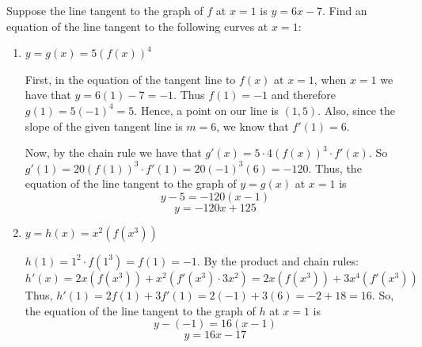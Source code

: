 \documentclass[nooutcomes,handout]{ximera}
\begin{document}
\begin{problem}
Suppose the line tangent to the graph of $f$ at $x=1$ is $y=6x-7$.  Find an equation of the line tangent to the following curves at $x=1$:
	\begin{enumerate}
	
	\item  $y=g(x) = 5(f(x))^4$  
		\begin{freeResponse}
		First, in the equation of the tangent line to $f(x)$ at $x=1$, when $x=1$ we have that $y= 6(1) - 7 = -1$.  Thus $f(1) = -1$ and therefore $g(1) = 5(-1)^4 = 5$.  Hence, a point on our line is $(1,5)$.  Also, since the slope of the given tangent line is $m=6$, we know that $f'(1) = 6$.
		
		Now, by the chain rule we have that $g'(x) = 5 \cdot 4 (f(x))^3 \cdot f'(x)$.  So $g'(1) = 20(f(1))^3 \cdot f'(1) = 20(-1)^3 (6) = -120.$  Thus, the equation of the line tangent to the graph of $y = g(x)$ at $x=1$ is
		$$ y - 5 = -120(x-1) $$
		$$ y = -120x + 125 $$
		\end{freeResponse}

	\item  $y=h(x) = x^2 (f(x^3))$
		\begin{freeResponse}
		$h(1) = 1^2 \cdot f(1^3) = f(1) = -1$.  By the product and chain rules:
		$$ h'(x) = 2x(f(x^3)) + x^2(f'(x^3) \cdot 3x^2) = 2x(f(x^3)) + 3x^4(f'(x^3)) $$
		Thus, $h'(1) = 2f(1) + 3f'(1) = 2(-1) + 3(6) = -2 + 18 = 16$.  So, the equation of the line tangent to the graph of $h$ at $x=1$ is
		$$ y- (-1) = 16(x-1) $$
		$$ y = 16x - 17 $$
		\end{freeResponse}
	\end{enumerate}		
		
		
	
\end{problem}
\end{document}
